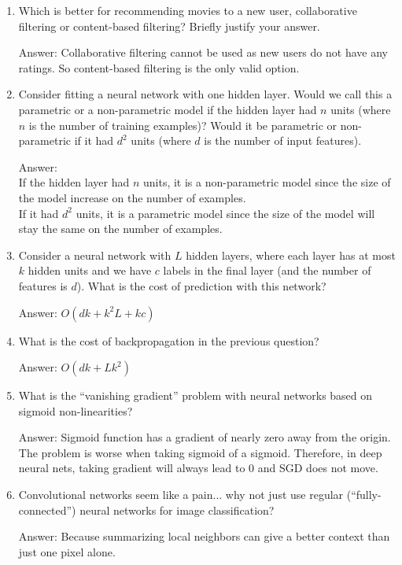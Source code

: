 \documentclass{article}
\newcommand{\gre}[1]{\textcolor{gre}{#1}}
\newcommand\ans[1]{\par\gre{Answer: #1}}
\begin{document}
\begin{enumerate}
\begin{enumerate}
\end{enumerate}
\item Which is better for recommending movies to a new user, collaborative filtering or content-based filtering? Briefly justify your answer.
\ans{Collaborative filtering cannot be used as new users do not have any ratings. So content-based filtering is the only valid option.}
\item Consider fitting a neural network with one hidden layer. Would we call this a parametric or a non-parametric model if the hidden layer had $n$ units (where $n$ is the number of training examples)? Would it be parametric or non-parametric if it had $d^2$ units (where $d$ is the number of input features).
\ans{\\
If the hidden layer had $n$ units, it is a non-parametric model since the size of the model increase on the number of examples.\\
If it had $d^2$ units, it is a parametric model since the size of the model will stay the same on the number of examples.}
\item Consider a neural network with $L$ hidden layers, where each layer has at most $k$ hidden units and we have $c$ labels in the final layer (and the number of features is $d$). What is the cost of prediction with this network?
\ans{$O(dk+k^2L+kc)$}
\item What is the cost of backpropagation in the previous question?
\ans{$O(dk+Lk^2)$}
\item What is the ``vanishing gradient'' problem with neural networks based on sigmoid non-linearities?
\ans{Sigmoid function has a gradient of nearly zero away from the origin. The problem is worse when taking sigmoid of a sigmoid. Therefore, in deep neural nets, taking gradient will always lead to 0 and SGD does not move.}
\item Convolutional networks seem like a pain... why not just use regular (``fully-connected'') neural networks for image classification?
\ans{Because summarizing local neighbors can give a better context than just one pixel alone.}

\end{enumerate}
\end{document}
